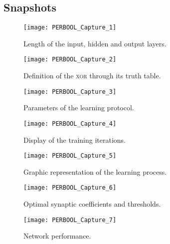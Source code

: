 \subsection{Snapshots}
\begin{figure}[h!t]
\centering
\texttt{[image: PERBOOL\_Capture\_1]}
\caption{Length of the input, hidden and output layers.}\label{PERBOOL_Capture_1}
\end{figure}
\begin{figure}[h!t]
\centering
\texttt{[image: PERBOOL\_Capture\_2]}
\caption{Definition of the \textsc{xor} through its truth table.}\label{PERBOOL_Capture_2}
\end{figure}
\begin{figure}[h!t]
\centering
\texttt{[image: PERBOOL\_Capture\_3]}
\caption{Parameters of the learning protocol.}\label{PERBOOL_Capture_3}
\end{figure}
\begin{figure}[h!t]
\centering
\texttt{[image: PERBOOL\_Capture\_4]}
\caption{Display of the training iterations.}\label{PERBOOL_Capture_4}
\end{figure}
\begin{figure}[h!t]
\centering
\texttt{[image: PERBOOL\_Capture\_5]}
\caption{Graphic representation of the learning process.}\label{PERBOOL_Capture_5}
\end{figure}
\begin{figure}[h!t]
\centering
\texttt{[image: PERBOOL\_Capture\_6]}
\caption{Optimal synaptic coefficients and thresholds.}\label{PERBOOL_Capture_6}
\end{figure}
\begin{figure}[h!t]
\centering
\texttt{[image: PERBOOL\_Capture\_7]}
\caption{Network performance.}\label{PERBOOL_Capture_7}
\end{figure}
\clearpage

